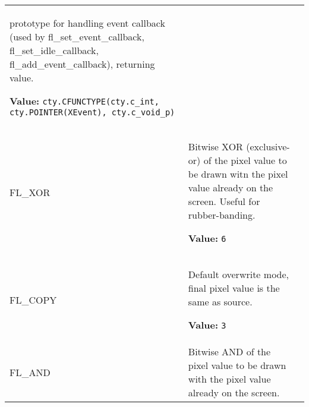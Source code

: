 \begin{longtable}{|p{\varnamewidth}|p{\vardescrwidth}|l}
prototype for handling event callback (used by fl\_set\_event\_callback,
fl\_set\_idle\_callback, fl\_add\_event\_callback), returning value.

\textbf{Value:} 
{\tt cty.CFUNCTYPE(cty.c\_int, cty.POINTER(XEvent), cty.c\_void\_p)}&\\
\cline{1-2}
\raggedright F\-L\-\_\-X\-O\-R\- & \raggedright Bitwise XOR (exclusive-or) of the pixel value to be drawn witn the
pixel value already on the screen. Useful for rubber-banding.

\textbf{Value:} 
{\tt 6}&\\
\cline{1-2}
\raggedright F\-L\-\_\-C\-O\-P\-Y\- & \raggedright Default overwrite mode, final pixel value is the same as source.

\textbf{Value:} 
{\tt 3}&\\
\cline{1-2}
\raggedright F\-L\-\_\-A\-N\-D\- & \raggedright Bitwise AND of the pixel value to be drawn with the pixel value
already on the screen.


\end{longtable}
